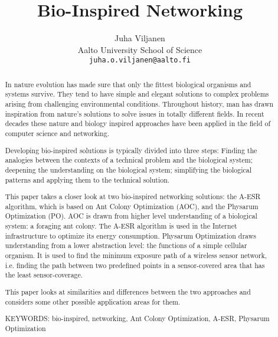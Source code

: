\documentclass{IWORK2014}
\begin{document}

\title{Bio-Inspired Networking}

\author{Juha Viljanen\\
        Aalto University School of Science \\
	\texttt{juha.o.viljanen@aalto.fi}}
\maketitle


\begin{abstract}
In nature evolution has made sure that only the fittest biological organisms and systems survive. They tend to have simple and elegant solutions to complex problems arising from challenging environmental conditions. Throughout history, man has drawn inspiration from nature's solutions to solve issues in totally different fields. In recent decades these nature and biology inspired approaches have been applied in the field of computer science and networking.

Developing bio-inspired solutions is typically divided into three steps: Finding the analogies between the contexts of a technical problem and the biological system; deepening the understanding on the biological system; simplifying the biological patterns and applying them to the technical solution.

This paper takes a closer look at two bio-inspired networking solutions: the A-ESR algorithm, which is based on Ant Colony Optimization (AOC), and the Physarum Optimization (PO). AOC is drawn from higher level understanding of a biological system: a foraging ant colony. The A-ESR algorithm is used in the Internet infrastructure to optimize its energy consumption. Physarum Optimization draws understanding from a lower abstraction level: the functions of a simple cellular organism. It is used to find the minimum exposure path of a wireless sensor network, i.e. finding the path between two predefined points in a sensor-covered area that has the least sensor-coverage.

This paper looks at similarities and differences between the two approaches and considers some other possible application areas for them.

\vspace{3mm}
\noindent KEYWORDS: bio-inspired, networking, Ant Colony Optimization, A-ESR, Physarum Optimization

\end{abstract}
\end{document}

